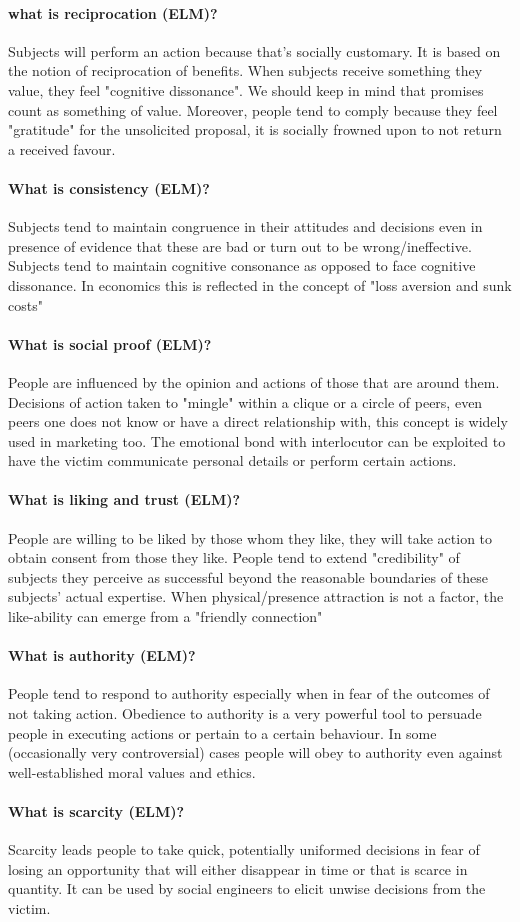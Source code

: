 \paragraph{what is reciprocation (ELM)?}
Subjects will perform an action because that's socially customary. It is based on the notion of reciprocation of benefits. When subjects receive something they value, they feel "cognitive dissonance". We should keep in mind that promises count as something of value. Moreover, people tend to comply because they feel "gratitude" for the unsolicited proposal, it is socially frowned upon to not return a received favour.

\paragraph{What is consistency (ELM)?}
Subjects tend to maintain congruence in their attitudes and decisions even in presence of evidence that these are bad or turn out to be wrong/ineffective. Subjects tend to maintain cognitive consonance as opposed to face cognitive dissonance. In economics this is reflected in the concept of "loss aversion and sunk costs"

\paragraph{What is social proof (ELM)?}
People are influenced by the opinion and actions of those that are around them. Decisions of action taken to "mingle" within a clique or a circle of peers, even peers one does not know or have a direct relationship with, this concept is widely used in marketing too. The emotional bond with interlocutor can be exploited to have the victim communicate personal details or perform certain actions. 

\paragraph{What is liking and trust (ELM)?}
People are willing to be liked by those whom they like, they will take action to obtain consent from those they like. People tend to extend "credibility" of subjects they perceive as successful beyond the reasonable boundaries of these subjects' actual expertise. When physical/presence attraction is not a factor, the like-ability can emerge from a "friendly connection"

\paragraph{What is authority (ELM)?}
People tend to respond to authority especially when in fear of the outcomes of not taking action. Obedience to authority is a very powerful tool to persuade people in executing actions or pertain to a certain behaviour. In some (occasionally very controversial) cases people will obey to authority even against well-established moral values and ethics.

\paragraph{What is scarcity (ELM)?}
 Scarcity leads people to take quick, potentially uniformed decisions in fear of losing an opportunity that will either disappear in time or that is scarce in quantity. It can be used by social engineers to elicit unwise decisions from the victim. 